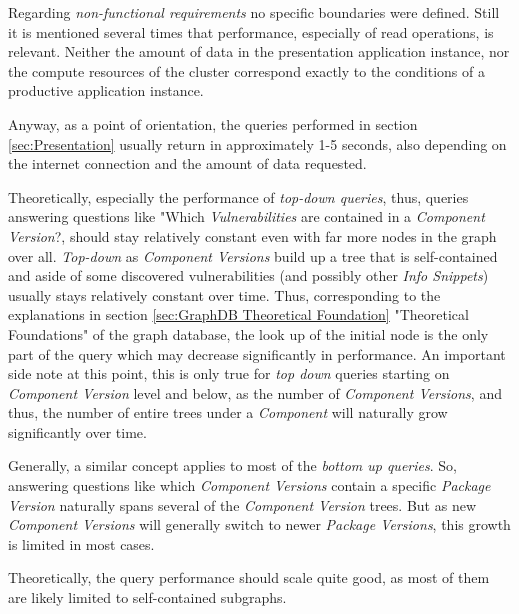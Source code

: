 Regarding \emph{non-functional requirements} no specific boundaries were defined. Still it is mentioned several times that performance, especially of read operations, is relevant. Neither the amount of data in the presentation application instance, nor the compute resources of the cluster correspond exactly to the conditions of a productive application instance.\par
Anyway, as a point of orientation, the queries performed in section \ref{sec:Presentation} usually return in approximately 1-5 seconds, also depending on the internet connection and the amount of data requested.\par 
Theoretically, especially the performance of \emph{top-down queries}, thus, queries answering questions like "Which \emph{Vulnerabilities} are contained in a \emph{Component Version}?, should stay relatively constant even with far more nodes in the graph over all. \emph{Top-down} as \emph{Component Versions} build up a tree that is self-contained and aside of some discovered vulnerabilities (and possibly other \emph{Info Snippets}) usually stays relatively constant over time. Thus, corresponding to the explanations in section \ref{sec:GraphDB Theoretical Foundation} "Theoretical Foundations" of the graph database, the look up of the initial node is the only part of the query which may decrease significantly in performance. An important side note at this point, this is only true for \emph{top down} queries starting on \emph{Component Version} level and below, as the number of \emph{Component Versions}, and thus, the number of entire trees under a \emph{Component} will naturally grow significantly over time.\par
Generally, a similar concept applies to most of the \emph{bottom up queries}. So, answering questions like which \emph{Component Versions} contain a specific \emph{Package Version} naturally spans several of the \emph{Component Version} trees. But as new \emph{Component Versions} will generally switch to newer \emph{Package Versions}, this growth is limited in most cases.\par
Theoretically, the query performance should scale quite good, as most of them are likely limited to self-contained subgraphs.\\

